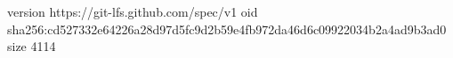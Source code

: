 version https://git-lfs.github.com/spec/v1
oid sha256:cd527332e64226a28d97d5fc9d2b59e4fb972da46d6c09922034b2a4ad9b3ad0
size 4114
